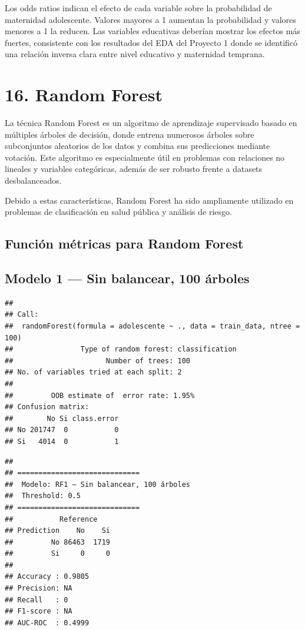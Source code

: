 \documentclass[
]{article}
\begin{document}
Los odds ratios indican el efecto de cada variable sobre la probabilidad
de maternidad adolescente. Valores mayores a 1 aumentan la probabilidad
y valores menores a 1 la reducen. Las variables educativas deberían
mostrar los efectos más fuertes, consistente con los resultados del EDA
del Proyecto 1 donde se identificó una relación inversa clara entre
nivel educativo y maternidad temprana.

\section{16. Random Forest}\label{random-forest}

La técnica Random Forest es un algoritmo de aprendizaje supervisado
basado en múltiples árboles de decisión, donde entrena numerosos árboles
sobre subconjuntos aleatorios de los datos y combina sus predicciones
mediante votación. Este algoritmo es especialmente útil en problemas con
relaciones no lineales y variables categóricas, además de ser robusto
frente a datasets desbalanceados.

Debido a estas características, Random Forest ha sido ampliamente
utilizado en problemas de clasificación en salud pública y análisis de
riesgo.

\subsection{Función métricas para Random
Forest}\label{funciuxf3n-muxe9tricas-para-random-forest}

\subsection{Modelo 1 --- Sin balancear, 100
árboles}\label{modelo-1-sin-balancear-100-uxe1rboles}

\begin{verbatim}
## 
## Call:
##  randomForest(formula = adolescente ~ ., data = train_data, ntree = 100) 
##                Type of random forest: classification
##                      Number of trees: 100
## No. of variables tried at each split: 2
## 
##         OOB estimate of  error rate: 1.95%
## Confusion matrix:
##        No Si class.error
## No 201747  0           0
## Si   4014  0           1
\end{verbatim}

\begin{verbatim}
## 
## =============================
##  Modelo: RF1 – Sin balancear, 100 árboles 
##  Threshold: 0.5 
## =============================
##           Reference
## Prediction    No    Si
##         No 86463  1719
##         Si     0     0
## 
## Accuracy : 0.9805 
## Precision: NA 
## Recall   : 0 
## F1-score : NA 
## AUC-ROC  : 0.4999
\end{verbatim}
\end{document}
